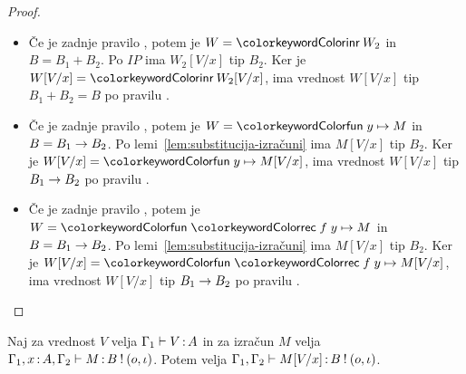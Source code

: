 \begin{proof}
\begin{itemize}
		\item Če je zadnje pravilo , potem je $W = \tminr{W_2}$ in $B = B_1 + B_2$. Po $IP$ ima $W_2[V/x]$ tip $B_2$.
		Ker je $W[V/x] = \tminr{W_2[V/x]}$, ima vrednost $W[V/x]$ tip $B_1 + B_2 = B$ po pravilu .
		
		\item Če je zadnje pravilo , potem je $W = \tmfunano{y}{M}$ in $B = B_1 \to B_2$. Po lemi~\ref{lem:substitucija-izračuni} ima $M[V/x]$ tip $B_2$.
		Ker je $W[V/x] = \tmfunano{y}{M[V/x]}$, ima vrednost $W[V/x]$ tip $B_1 \to B_2$ po pravilu .
		
		\item Če je zadnje pravilo , potem je $W = \tmfunrecano{f}{y}{M}$ in $B = B_1 \to B_2$. Po lemi~\ref{lem:substitucija-izračuni} ima $M[V/x]$ tip $B_2$.
		Ker je $W[V/x] = \tmfunrecano{f}{y}{M[V/x]}$, ima vrednost $W[V/x]$ tip $B_1 \to B_2$ po pravilu .
	\end{itemize}
\end{proof}


\begin{lema}\label{lem:substitucija-izračuni}
	Naj za vrednost $V$ velja $\Gamma_1 \vdash V \mathinner{:} A$ in za izračun $M$ velja $\Gamma_1, x \mathinner{:} A, \Gamma_2 \vdash M \mathinner{:} B \mathbin{!} (o, \iota)$. Potem velja $\Gamma_1, \Gamma_2 \vdash M[V/x] \mathinner{:} B \mathbin{!} (o, \iota)$.
\end{lema}

